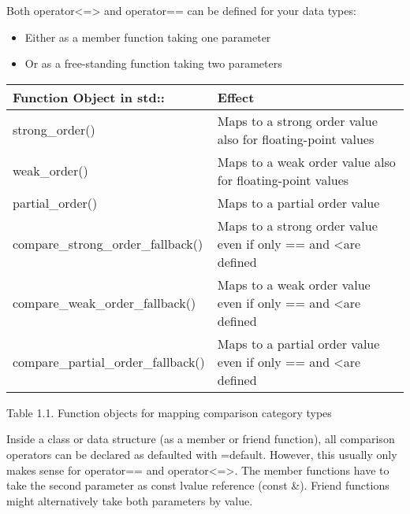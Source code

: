

Both operator<=> and operator== can be defined for your data types:

\begin{itemize}
\item
Either as a member function taking one parameter

\item
Or as a free-standing function taking two parameters
\end{itemize}


\begin{table}[H]
\begin{tabular}{|l|l|}
	\hline
	\textbf{Function Object in std::} & \textbf{Effect}                                             \\ \hline
	strong\_order()                   & Maps to a strong order value also for floating-point values \\ \hline
	weak\_order()                     & Maps to a weak order value also for floating-point values   \\ \hline
	partial\_order()                  & Maps to a partial order value                               \\ \hline
	compare\_strong\_order\_fallback()  & Maps to a strong order value even if only == and \textless are defined  \\ \hline
	compare\_weak\_order\_fallback()    & Maps to a weak order value even if only == and \textless are defined    \\ \hline
	compare\_partial\_order\_fallback() & Maps to a partial order value even if only == and \textless are defined \\ \hline
\end{tabular}
\end{table}

\begin{center}
Table 1.1. Function objects for mapping comparison category types
\end{center}



Inside a class or data structure (as a member or friend function), all comparison operators can be declared as defaulted with =default. However, this usually only makes sense for operator== and operator<=>. The member functions have to take the second parameter as const lvalue reference (const \&). Friend functions might alternatively take both parameters by value.


